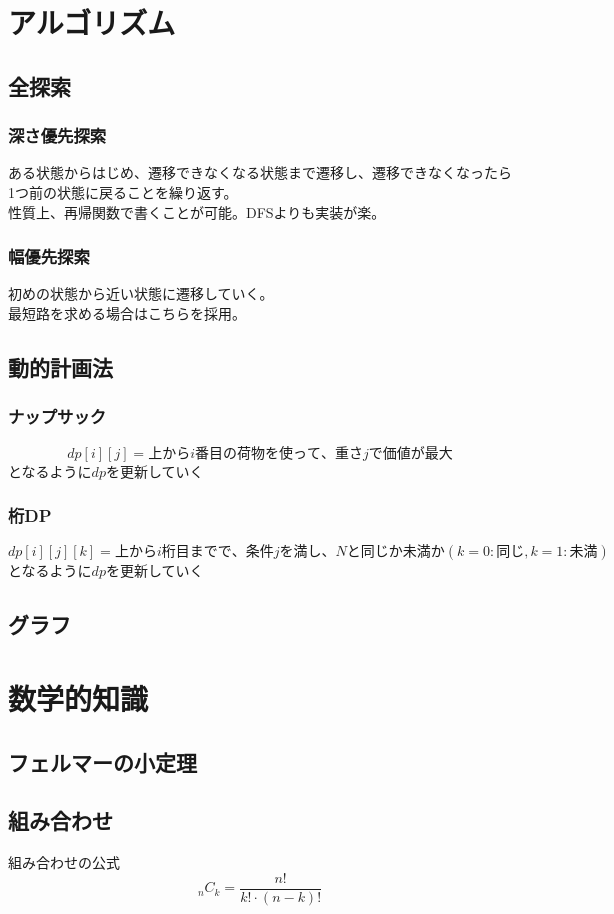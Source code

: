 \documentclass[a4paper]{jarticle}
\begin{document}
\tableofcontents
\newpage
\hypertarget{algorithm}{\section{アルゴリズム}}
\hypertarget{allserch}{\subsection{全探索}}
\hypertarget{dfs}{\subsubsection{深さ優先探索}}
ある状態からはじめ、遷移できなくなる状態まで遷移し、遷移できなくなったら1つ前の状態に戻ることを繰り返す。\\
性質上、再帰関数で書くことが可能。DFSよりも実装が楽。
\hypertarget{bfs}{\subsubsection{幅優先探索}}
初めの状態から近い状態に遷移していく。\\
最短路を求める場合はこちらを採用。
\hypertarget{dp}{\subsection{動的計画法}}
\hypertarget{napsack}{\subsubsection{ナップサック}}
\[
dp[i][j]=上からi番目の荷物を使って、重さjで価値が最大
\]
となるように$dp$を更新していく
\hypertarget{digitdp}{\subsubsection{桁DP}}
\[
dp[i][j][k]=上からi桁目までで、条件jを満し、Nと同じか未満か(k=0:同じ,k=1:未満)
\]
となるように$dp$を更新していく
\hypertarget{glaph}{\subsection{グラフ}}

\hypertarget{math}{\section{数学的知識}}
\hypertarget{felmat}{\subsection{フェルマーの小定理}}
\hypertarget{combination}{\subsection{組み合わせ}}
\begin{itembox}[l]{組み合わせの公式}
\[
{}_nC_k=\frac{n!}{k!\cdot (n-k)!}
\]
\end{itembox}
\end{document}
